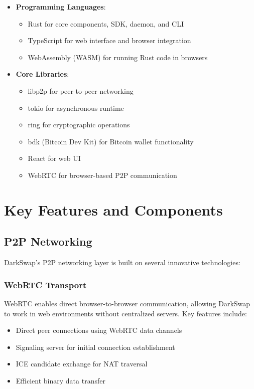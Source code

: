 \documentclass[11pt,a4paper]{article}
\begin{document}
\begin{itemize}
    \item \textbf{Programming Languages}:
    \begin{itemize}
        \item Rust for core components, SDK, daemon, and CLI
        \item TypeScript for web interface and browser integration
        \item WebAssembly (WASM) for running Rust code in browsers
    \end{itemize}
    
    \item \textbf{Core Libraries}:
    \begin{itemize}
        \item libp2p for peer-to-peer networking
        \item tokio for asynchronous runtime
        \item ring for cryptographic operations
        \item bdk (Bitcoin Dev Kit) for Bitcoin wallet functionality
        \item React for web UI
        \item WebRTC for browser-based P2P communication
    \end{itemize}
\end{itemize}

\section{Key Features and Components}

\subsection{P2P Networking}

DarkSwap's P2P networking layer is built on several innovative technologies:

\subsubsection{WebRTC Transport}

WebRTC enables direct browser-to-browser communication, allowing DarkSwap to work in web environments without centralized servers. Key features include:

\begin{itemize}
    \item Direct peer connections using WebRTC data channels
    \item Signaling server for initial connection establishment
    \item ICE candidate exchange for NAT traversal
    \item Efficient binary data transfer
\end{itemize}
\end{document}
